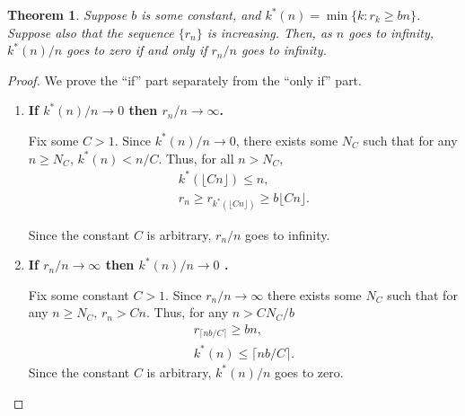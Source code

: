 \documentclass[11pt,notitlepage]{article}
\newtheorem{theorem}{Theorem}
\begin{document}
	\begin{theorem}
      \label{t:k.by.r}
		Suppose $b$ is some constant, and $k^\ast(n) =
                \min\{k: r_k \geq bn\}$. Suppose also that the
                sequence $\{r_n\}$ is increasing. Then, as $n$ goes to
                infinity,  $k^\ast(n)/n$ goes to zero  if and only if
                $r_n/n$ goes to infinity.
		\end{theorem}
	\begin{proof}
		We prove the ``if'' part separately from the ``only if'' part.
		\begin{enumerate}
			\item {\bf If  $k^\ast(n)/n \to 0$ then $r_n/n \to \infty$.}
			
			Fix some $C > 1$.  Since $k^\ast(n)/n \to 0$, there exists some $N_C$ such that  for any $n \geq N_C$, $k^\ast(n) < n/C.$ Thus,  for all $n > N_C$, 
			\begin{gather*}
			k^\ast(\lfloor Cn\rfloor) \leq n,\\
			 r_n \geq  r_{k^\ast(\lfloor Cn\rfloor)} \geq b\lfloor Cn\rfloor.
			 \end{gather*}
			 
			 Since the constant $C$ is arbitrary, $r_n/n$ goes to infinity.
		 
		 	\item {\bf If $r_n/n \to \infty$ then  $k^\ast(n)/n \to 0$ .}
		 	
		 	Fix some constant $C > 1$. Since $r_n/n \to \infty$  there exists some $N_C$ such that  for any $n \geq N_C$, $r_n > Cn$. Thus,  for any $n > CN_C/b$ 
		 	\begin{gather*}
			 	r_{\lceil nb/C\rceil } \geq bn,\\
			 	k^\ast(n) \leq \lceil nb/C\rceil.
			\end{gather*} 
		 	 Since the constant $C$ is arbitrary, $k^\ast(n)/n$ goes to zero.
		 \end{enumerate}
	\end{proof}
\end{document}
